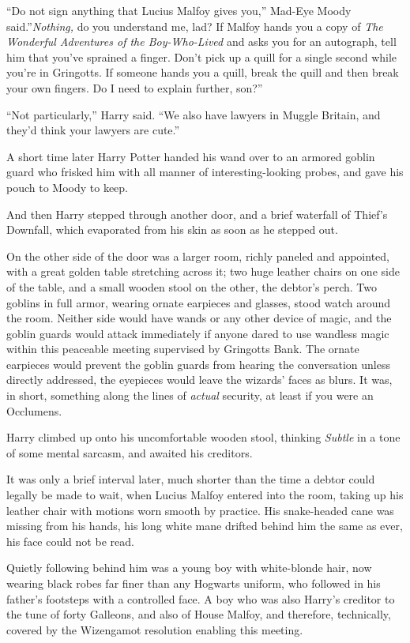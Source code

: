 ``Do not sign anything that Lucius Malfoy gives you,'' Mad-Eye Moody
said.''\emph{Nothing,} do you understand me, lad? If Malfoy hands you a
copy of \emph{The Wonderful Adventures of the Boy-Who-Lived} and asks
you for an autograph, tell him that you've sprained a finger. Don't pick
up a quill for a single second while you're in Gringotts. If someone
hands you a quill, break the quill and then break your own fingers. Do I
need to explain further, son?''

``Not particularly,'' Harry said. ``We also have lawyers in Muggle
Britain, and they'd think your lawyers are cute.''

A short time later Harry Potter handed his wand over to an armored
goblin guard who frisked him with all manner of interesting-looking
probes, and gave his pouch to Moody to keep.

And then Harry stepped through another door, and a brief waterfall of
Thief's Downfall, which evaporated from his skin as soon as he stepped
out.

On the other side of the door was a larger room, richly paneled and
appointed, with a great golden table stretching across it; two huge
leather chairs on one side of the table, and a small wooden stool on the
other, the debtor's perch. Two goblins in full armor, wearing ornate
earpieces and glasses, stood watch around the room. Neither side would
have wands or any other device of magic, and the goblin guards would
attack immediately if anyone dared to use wandless magic within this
peaceable meeting supervised by Gringotts Bank. The ornate earpieces
would prevent the goblin guards from hearing the conversation unless
directly addressed, the eyepieces would leave the wizards' faces as
blurs. It was, in short, something along the lines of \emph{actual}
security, at least if you were an Occlumens.

Harry climbed up onto his uncomfortable wooden stool, thinking
\emph{Subtle} in a tone of some mental sarcasm, and awaited his
creditors.

It was only a brief interval later, much shorter than the time a debtor
could legally be made to wait, when Lucius Malfoy entered into the room,
taking up his leather chair with motions worn smooth by practice. His
snake-headed cane was missing from his hands, his long white mane
drifted behind him the same as ever, his face could not be read.

Quietly following behind him was a young boy with white-blonde hair, now
wearing black robes far finer than any Hogwarts uniform, who followed in
his father's footsteps with a controlled face. A boy who was also
Harry's creditor to the tune of forty Galleons, and also of House
Malfoy, and therefore, technically, covered by the Wizengamot resolution
enabling this meeting.

